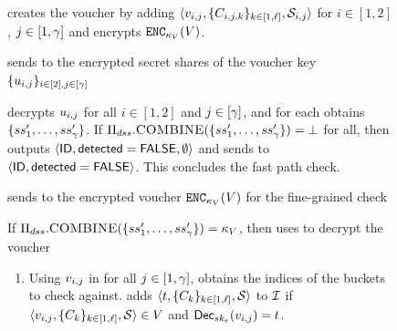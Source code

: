 \begin{figure}
{\begin{minipage}[t]{\textwidth}

\enumListEnd

\item \label{fuzzy:pre:voucher} \client creates the voucher \voucher  by adding $\langle \partitionEncryption{i, \projIdx}, \{\contentToken{i, \projIdx, \vecIdx}\}_{\vecIdx \in [1, \genericVecLen]} ,\genericSetVar[i, \projIdx] \rangle$ for $i \in [1,2]$, $j \in [1, \gamma]$ and encrypts $\encrypt[\voucherKey](\voucher)$. 

\item {} \client sends to \server the encrypted secret shares of the voucher key $\{\secretShareEncryption{\tblIdx,\projIdx}\}_{\tblIdx \in [2], \projIdx \in \nats[\numProjections]}$


\item  \server decrypts $\secretShareEncryption{i, \projIdx}$ for all $i \in [1,2]$ and $\projIdx \in \nats[\numProjections]$, and for each obtains $\{ ss_{1}', \dots, ss_{\gamma}'\}$. If $\Pi_{dss}.\textsc{COMBINE}(\{ ss_{1}', \dots, ss_{\gamma}'\}) = \bot$ for all, then \server outputs $\langle \mathsf{ID}, \mathsf{detected} = \mathsf{FALSE}, \emptyset \rangle$ and sends to \client $\langle \mathsf{ID}, \mathsf{detected}=\mathsf{FALSE}\rangle$. This concludes the fast path check. 

\item {} \client sends to \server the encrypted voucher $\encrypt[\voucherKey](\voucher)$ for the fine-grained check


\item \label{fuzzy:pre:dhf2}  If $\Pi_{dss}.\textsc{COMBINE}(\{ ss_{1}', \dots, ss_{\gamma}'\}) = \kappa_{V}$, then \server uses \voucherKey to decrypt the voucher \voucher 

\begin{enumerate}
\item Using $\partitionEncryption{i, \projIdx}$ in \voucher for all $j \in [1, \gamma]$, \server obtains the indices of the buckets to check against. \server adds $\langle \bucketIdx, \{\contentToken{\vecIdx}\}_{\vecIdx \in [1, \genericVecLen]} ,\genericSetVar \rangle$ to $\mathcal{I}$ if $\langle \partitionEncryption{i, \projIdx}, \{\contentToken{\vecIdx}\}_{\vecIdx \in [1, \genericVecLen]} ,\genericSetVar \rangle \in \voucher$ and $\pkdecrypt[\encryptPrivKey](\partitionEncryption{i, \projIdx}) = \bucketIdx$. 


\end{enumerate}
\end{minipage}}
\end{figure}
